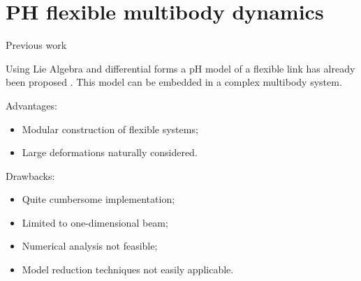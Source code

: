\documentclass[aspectratio=169]{ISAE-Beamer}
\begin{document}
\section{PH flexible multibody dynamics}

\begin{frame}{Previous work}

Using Lie Algebra and differential forms a pH model of a flexible link has already been proposed . This model can be embedded in a complex multibody system. \\

\begin{overlayarea}{\textwidth}{0.55\textheight}
	\setlength{\abovedisplayskip}{1pt}
	\setlength{\belowdisplayskip}{1pt}
	Advantages:
	\begin{itemize}
		\item {Modular construction of flexible systems;}
		\item {Large deformations naturally considered.}
	\end{itemize}
	Drawbacks:
	\begin{itemize}
		\item {Quite cumbersome implementation;}
		\item {Limited to one-dimensional beam;}
		\item {Numerical analysis not feasible;}
		\item {Model reduction techniques not easily applicable.} 
	\end{itemize}
\end{overlayarea}
\end{frame}
\end{document}
